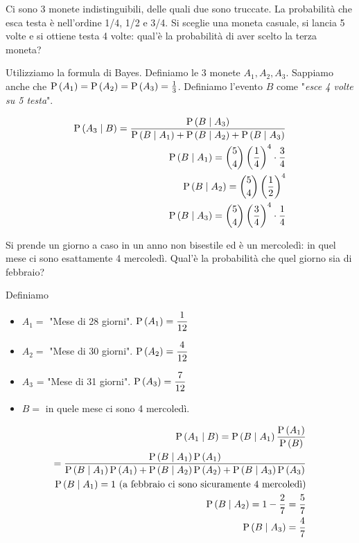 \begin{exrc}
    Ci sono 3 monete indistinguibili, delle quali due sono truccate.
    La probabilità che esca testa è nell'ordine 1/4, 1/2 e 3/4.
    Si sceglie una moneta casuale, si lancia 5 volte e si ottiene testa 4 volte: qual'è la probabilità di aver scelto la terza moneta?

    Utilizziamo la formula di Bayes. Definiamo le 3 monete $A_1, A_2, A_3$. Sappiamo anche che $ \text{P}\left(A_1\right) = \text{P}\left(A_2\right) = \text{P}\left(A_3\right) = \frac{1}{3} $. Definiamo l'evento $ B $ come "\textit{esce 4 volte su 5 testa}".

    \begin{equation*}
        \begin{aligned}
            \text{P}\left(A_3 \mid B\right) = \dfrac{\text{P}\left(B \mid A_3\right)}{\text{P}\left(B \mid A_1\right) + \text{P}\left(B \mid A_2\right) + \text{P}\left(B \mid A_3\right)} \\
            \text{P}\left(B \mid A_1\right) = \binom{5}{4} \left(\dfrac{1}{4}\right)^4 \cdot \dfrac{3}{4}\\
            \text{P}\left(B \mid A_2\right) = \binom{5}{4} \left(\dfrac{1}{2}\right)^4 \\
            \text{P}\left(B \mid A_3\right) = \binom{5}{4} \left(\dfrac{3}{4}\right)^4 \cdot \dfrac{1}{4}\\
        \end{aligned}
    \end{equation*}
\end{exrc}

\begin{exrc}
    Si prende un giorno a caso in un anno non bisestile ed è un mercoledì: in quel mese ci sono esattamente 4 mercoledì. Qual'è la probabilità che quel giorno sia di febbraio?

    Definiamo
    \begin{itemize}
        \item $ A_1 = $ "Mese di 28 giorni". $ \text{P}\left(A_1\right) = \dfrac{1}{12} $
        \item $ A_2 = $ "Mese di 30 giorni". $ \text{P}\left(A_2\right) = \dfrac{4}{12} $
        \item $ A_3 $ = "Mese di 31 giorni". $ \text{P}\left(A_3\right) = \dfrac{7}{12} $
        \item $ B = $ in quele mese ci sono 4 mercoledì.
    \end{itemize}

    \begin{equation*}
        \begin{aligned}
            \text{P}\left(A_1 \mid B\right) = \text{P}\left(B \mid A_1\right) \dfrac{\text{P}\left(A_1\right)}{\text{P}\left(B\right)} \\
            = \dfrac{\text{P}\left(B \mid A_1\right) \text{P}\left(A_1\right)}{\text{P}\left(B \mid A_1\right)\text{P}\left(A_1\right) + \text{P}\left(B \mid A_2\right)\text{P}\left(A_2\right) + \text{P}\left(B \mid A_3\right)\text{P}\left(A_3\right)} \\
            \text{P}\left(B \mid A_1\right) = 1 \text{ (a febbraio ci sono sicuramente 4 mercoledì)} \\
            \text{P}\left(B \mid A_2\right) = 1 - \dfrac{2}{7} = \dfrac{5}{7}\\
            \text{P}\left(B \mid A_3\right) = \dfrac{4}{7}
        \end{aligned}
    \end{equation*}
\end{exrc}


